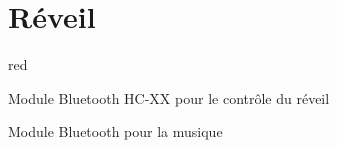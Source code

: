 \chapter{Réveil}

\begin{items}{red}{\faviconBookmark}
\item Module Bluetooth HC-XX pour le contrôle du réveil
\item Module Bluetooth pour la musique
\end{items}